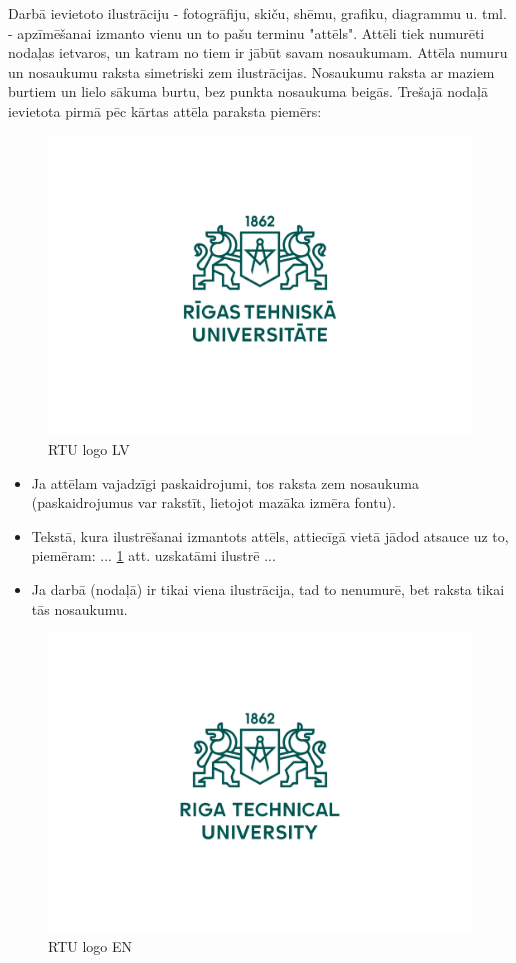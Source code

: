 \hspace*{5mm}
Darbā ievietoto ilustrāciju - fotogrāfiju, skiču, shēmu, grafiku, diagrammu u. tml. -
apzīmēšanai izmanto vienu un to pašu terminu "attēls". Attēli tiek numurēti nodaļas
ietvaros, un katram no tiem ir jābūt savam nosaukumam. Attēla numuru un
nosaukumu raksta simetriski zem ilustrācijas. Nosaukumu raksta ar maziem burtiem
un lielo sākuma burtu, bez punkta nosaukuma beigās. Trešajā nodaļā ievietota pirmā
pēc kārtas attēla paraksta piemērs:
		\begin{figure}[H]
		  \centering
		  \includegraphics[width=.6\textwidth]{sections/pic/RTU_logotips_rgb_LV.pdf}
		  \caption{RTU logo LV}
		  \label{fig:rtu_lv}
		\end{figure}
\begin{itemize}
    \item Ja attēlam vajadzīgi paskaidrojumi, tos raksta zem nosaukuma (paskaidrojumus var rakstīt, lietojot mazāka izmēra fontu).
    \item Tekstā, kura ilustrēšanai izmantots attēls, attiecīgā vietā jādod atsauce uz to, piemēram: ... \ref{fig:rtu_lv} att. uzskatāmi ilustrē ...
    \item Ja darbā (nodaļā) ir tikai viena ilustrācija, tad to nenumurē, bet raksta tikai tās nosaukumu.	
\end{itemize}

        \begin{figure}[H]
		  \centering
		  \includegraphics[width=.3\textwidth]{sections/pic/RTU_logotips_rgb_EN.pdf}
		  \caption{RTU logo EN}
		  \label{fig:rtu_en}
		\end{figure}

